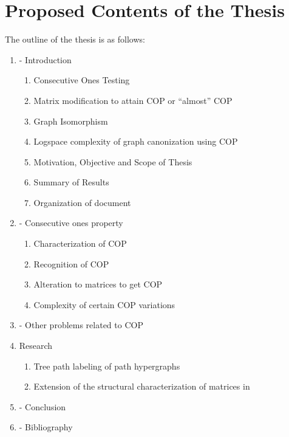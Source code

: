 \documentclass[MS,synopsis]{iitmdiss}
\begin{document}

\section{Proposed Contents of the Thesis}
The outline of the thesis is as follows:

\begin{enumerate}[{Chapter} 1]
\item - Introduction
  \begin{enumerate} [{Section 1.}1]
  \item Consecutive Ones Testing
  \item Matrix modification to attain COP or ``almost'' COP
  \item Graph Isomorphism
  \item Logspace complexity of graph canonization using COP
  \item Motivation, Objective and Scope of Thesis
  \item Summary of Results
  \item Organization of document
  \end{enumerate}

\item - Consecutive ones property %
  \begin{enumerate}[{Section 2.}1]
  \item Characterization of COP
  \item Recognition of COP
  \item Alteration to matrices to get COP
  \item Complexity of certain COP variations
  \end{enumerate}

\item - Other problems related to COP %

\item Research %
  \begin{enumerate}[{Section 4.}1]
  \item Tree path labeling of path
    hypergraphs %
  \item Extension of the structural characterization of matrices in \cite{nsnrs09}
  \end{enumerate}

\item - Conclusion

\item - Bibliography

\end{enumerate}
\end{document}
